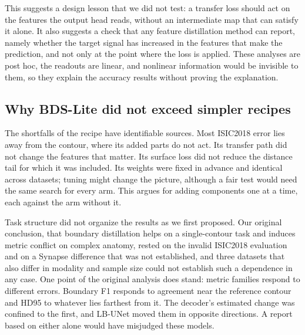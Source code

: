 \documentclass[fleqn,10pt,lineno]{wlpeerj}
\begin{document}
This suggests a design lesson that we did not test: a transfer loss should act on the features the output head reads, without an intermediate map that can satisfy it alone. It also suggests a check that any feature distillation method can report, namely whether the target signal has increased in the features that make the prediction, and not only at the point where the loss is applied. These analyses are post hoc, the readouts are linear, and nonlinear information would be invisible to them, so they explain the accuracy results without proving the explanation.

\subsection*{Why BDS-Lite did not exceed simpler recipes}
The shortfalls of the recipe have identifiable sources. Most ISIC2018 error lies away from the contour, where its added parts do not act. Its transfer path did not change the features that matter. Its surface loss did not reduce the distance tail for which it was included. Its weights were fixed in advance and identical across datasets; tuning might change the picture, although a fair test would need the same search for every arm. This argues for adding components one at a time, each against the arm without it.

Task structure did not organize the results as we first proposed. Our original conclusion, that boundary distillation helps on a single-contour task and induces metric conflict on complex anatomy, rested on the invalid ISIC2018 evaluation and on a Synapse difference that was not established, and three datasets that also differ in modality and sample size could not establish such a dependence in any case. One point of the original analysis does stand: metric families respond to different errors. Boundary F1 responds to agreement near the reference contour and HD95 to whatever lies farthest from it. The decoder's estimated change was confined to the first, and LB-UNet moved them in opposite directions. A report based on either alone would have misjudged these models.
\end{document}
